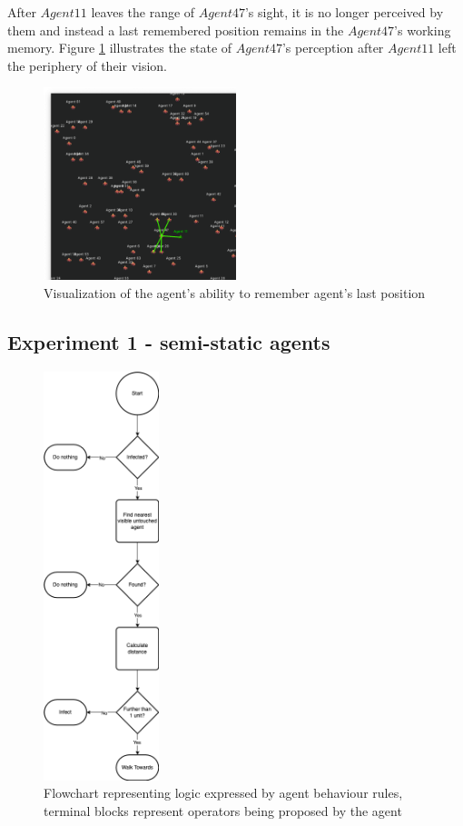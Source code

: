 After $Agent11$ leaves the range of $Agent47$'s sight, it is no longer perceived by them and instead a last remembered position remains in the $Agent47$'s working memory.
Figure \ref{fig:images/visibility/agent47_moved.png} illustrates the state of $Agent47$'s perception after $Agent11$ left the periphery of their vision.

\begin{figure}[H]
    \centering
    \includegraphics[width=0.5\textwidth]{images/visibility/agent47_moved.png}
    \caption{Visualization of the agent's ability to remember agent's last position}\label{fig:images/visibility/agent47_moved.png}
\end{figure}

\subsection{Experiment 1 - semi-static agents}

\begin{figure}[H]
    \centering
    \includegraphics[width=0.3\textwidth]{images/chapter2/sir_logic.drawio.png}
    \caption{Flowchart representing logic expressed by agent behaviour rules, terminal blocks represent operators being proposed by the agent}\label{fig:sir_logic.drawio.png}
\end{figure}

